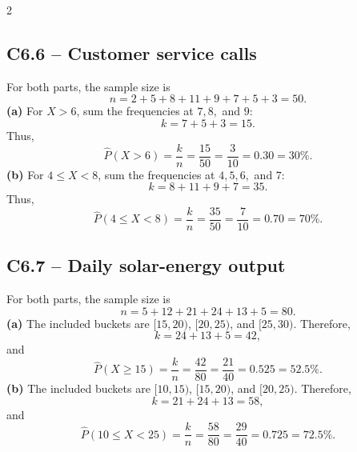 \begin{multicols}{2}
	\subsection*{C6.6 -- Customer service calls}
	For both parts, the sample size is
	\[
		n=2+5+8+11+9+7+5+3=50.
	\]
	\textbf{(a)} For $X>6$, sum the frequencies at $7,8,$ and $9$:
	\[
		k=7+5+3=15.
	\]
	Thus,
	\[
		\widehat P(X>6)=\frac{k}{n}=\frac{15}{50}=\frac3{10}=0.30=30\%.
	\]
	\textbf{(b)} For $4\leq X<8$, sum the frequencies at $4,5,6,$ and $7$:
	\[
		k=8+11+9+7=35.
	\]
	Thus,
	\[
		\widehat P(4\leq X<8)=\frac{k}{n}=\frac{35}{50}=\frac7{10}=0.70=70\%.
	\]

	\subsection*{C6.7 -- Daily solar-energy output}
	For both parts, the sample size is
	\[
		n=5+12+21+24+13+5=80.
	\]
	\textbf{(a)} The included buckets are $[15,20)$, $[20,25)$, and
	$[25,30)$. Therefore,
	\[
		k=24+13+5=42,
	\]
	and
	\[
		\widehat P(X\geq15)=\frac{k}{n}=\frac{42}{80}=\frac{21}{40}
		=0.525=52.5\%.
	\]
	\textbf{(b)} The included buckets are $[10,15)$, $[15,20)$, and
	$[20,25)$. Therefore,
	\[
		k=21+24+13=58,
	\]
	and
	\[
		\widehat P(10\leq X<25)=\frac{k}{n}=\frac{58}{80}=\frac{29}{40}
		=0.725=72.5\%.
	\]

\end{multicols}


